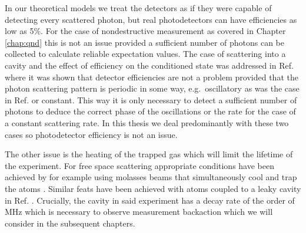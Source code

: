In our theoretical models we treat the detectors as if they were
capable of detecting every scattered photon, but real photodetectors
can have efficiencies as low as 5\%. For the case of nondestructive
measurement as covered in Chapter \ref{chap:qnd} this is not an issue
provided a sufficient number of photons can be collected to calculate
reliable expectation values. The case of scattering into a cavity and
the effect of efficiency on the conditioned state was addressed in
Ref. \cite{mazzucchi2016njp} where it was shown that detector
efficiencies are not a problem provided that the photon scattering
pattern is periodic in some way, e.g.~oscillatory as was the case in
Ref. \cite{mazzucchi2016njp} or constant. This way it is only
necessary to detect a sufficient number of photons to deduce the
correct phase of the oscillations or the rate for the case of a
constant scattering rate. In this thesis we deal predominantly with
these two cases so photodetector efficiency is not an issue.

The other issue is the heating of the trapped gas which will limit the
lifetime of the experiment. For free space scattering appropriate
conditions have been achieved by for example using molasses beams that
simultaneously cool and trap the atoms \cite{weitenberg2011,
  weitenbergThesis}. Similar feats have been achieved with atoms
coupled to a leaky cavity in Ref. \cite{brennecke2013}. Crucially, the
cavity in said experiment has a decay rate of the order of MHz which
is necessary to observe measurement backaction which we will consider
in the subsequent chapters.
